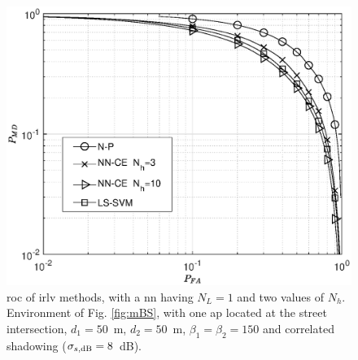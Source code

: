 \documentclass[draftcls,onecolumn,12pt]{IEEEtran}
\begin{document}
\begin{figure}[t]
    \centering
    \includegraphics[width=0.6\columnwidth]{res_NP_approx_SVM.eps}
    \caption{\ac{roc} of \ac{irlv} methods, with a \ac{nn} having $N_L=1$ and two values of $N_h$. Environment of Fig. \ref{fig:mBS}, with one \ac{ap} located at the street intersection, $d_1 = 50$~m, $d_2 = 50$~m, $\beta_1 = \beta_2 = 150$ and correlated shadowing ($\sigma_{s, {\rm dB}} = 8$~dB).}
    \label{fig:trueMap}
\end{figure}
\end{document}
